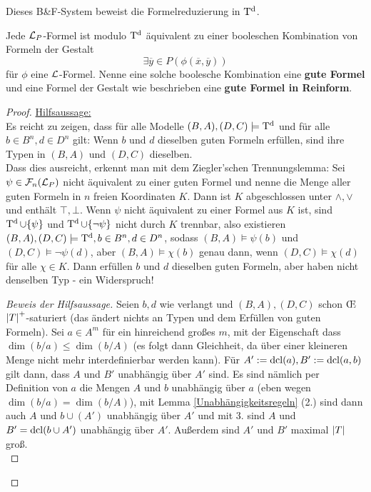 Dieses B\&F-System beweist die Formelreduzierung in $\operatorname{T^d}$.
\begin{theorem}
	Jede $\mathcal{L}_P$-Formel ist modulo $\operatorname{T^d}$ äquivalent zu einer booleschen Kombination von Formeln der Gestalt
	$$\exists\overline{y}\in P(\phi(\overline{x},\overline{y}))$$
	für $\phi$ eine $\mathcal{L}$-Formel. Nenne eine solche boolesche Kombination eine \textbf{gute Formel} und eine Formel der Gestalt wie beschrieben eine \textbf{gute Formel in Reinform}.
\end{theorem}
\begin{proof}
	\underline{Hilfsaussage:}\\
	Es reicht zu zeigen, dass für alle Modelle $(B,A),(D,C)\models\operatorname{T^d}$ und für alle $b\in B^n,d\in D^n$ gilt: Wenn $b$ und $d$ dieselben guten Formeln erfüllen, sind ihre Typen in $(B,A)$ und $(D,C)$ dieselben.\\
	Dass dies ausreicht, erkennt man mit dem Ziegler'schen Trennungslemma: Sei $\psi\in\mathcal{F}_n(\mathcal{L}_P)$ nicht äquivalent zu einer guten Formel und nenne die Menge aller guten Formeln in $n$ freien Koordinaten $K$. Dann ist $K$ abgeschlossen unter $\land,\lor$ und enthält $\top,\bot$. Wenn $\psi$ nicht äquivalent zu einer Formel aus $K$ ist, sind $\operatorname{T^d}\cup\{\psi\}$ und $\operatorname{T^d}\cup\{\neg\psi\}$ nicht durch $K$ trennbar, also existieren $(B,A),(D,C)\models\operatorname{T^d},b\in B^n,d\in D^n$, sodass $(B,A)\models\psi(b)$ und $(D,C)\models\neg\psi(d)$, aber $(B,A)\models\chi(b)$ genau dann, wenn $(D,C)\models\chi(d)$ für alle $\chi\in K$. Dann erfüllen $b$ und $d$ dieselben guten Formeln, aber haben nicht denselben Typ - ein Widerspruch!\\
	\begin{proof}[Beweis der Hilfsaussage]
		Seien $b,d$ wie verlangt und $(B,A),(D,C)$ schon \OE\linebreak ${\left| T \right|}^+$-saturiert (das ändert nichts an Typen und dem Erfüllen von guten Formeln). Sei $a\in A^m$ für ein hinreichend großes $m$, mit der Eigenschaft dass $\dim(b/a)\leq\dim(b/A)$ (es folgt dann Gleichheit, da über einer kleineren Menge nicht mehr interdefinierbar werden kann). Für $A':=\operatorname{dcl}(a),B':=\operatorname{dcl}(a,b)$ gilt dann, dass $A$ und $B'$ unabhängig über $A'$ sind. Es sind nämlich per Definition von $a$ die Mengen $A$ und $b$ unabhängig über $a$ (eben wegen $\dim(b/a)=\dim(b/A)$), mit Lemma \ref{Unabhängigkeitsregeln} (2.) sind dann auch $A$ und $b\cup(A')$ unabhängig über $A'$ und mit 3. sind $A$ und $B'=\operatorname{dcl}(b\cup A')$ unabhängig über $A'$. Außerdem sind $A'$ und $B'$ maximal ${\left| T \right|}$ groß.\\

\end{proof}
\end{proof}

